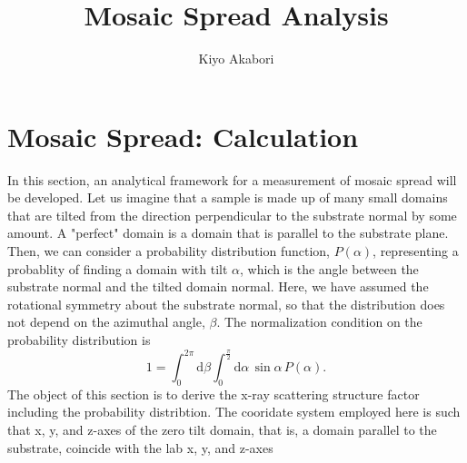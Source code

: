 \documentclass[letterpaper,12pt]{article}
\author{Kiyo Akabori}
\title{Mosaic Spread Analysis}
\begin{document}




\section{Mosaic Spread: Calculation}
In this section, an analytical framework for a measurement of mosaic spread will 
be developed. Let us imagine that a sample is made up of many small domains that are 
tilted from the direction perpendicular to the substrate normal by some amount. 
A "perfect" domain is a domain that is parallel to the substrate plane.
Then, we can consider a probability distribution function, $P(\alpha)$, 
representing a probablity of finding a domain with tilt $\alpha$, which is the angle
between the substrate normal and the tilted domain normal. Here, we have
assumed the rotational symmetry about the substrate normal, so that the distribution
does not depend on the azimuthal angle, $\beta$. The normalization condition on the probability distribution is 
\begin{equation}
  1 = \int_0^{2\pi} \!\! \mathrm{d}\beta  \int_0^{\frac{\pi}{2}} \! \mathrm{d}\alpha \, 
      \sin\alpha \, P(\alpha).
\end{equation}
The object of this section is to derive the x-ray scattering structure factor 
including the probability distribtion. The cooridate system employed here is such that x, y, and
z-axes of the zero tilt domain, that is, a domain parallel to the substrate, 
coincide with the lab x, y, and z-axes 
\end{document}
